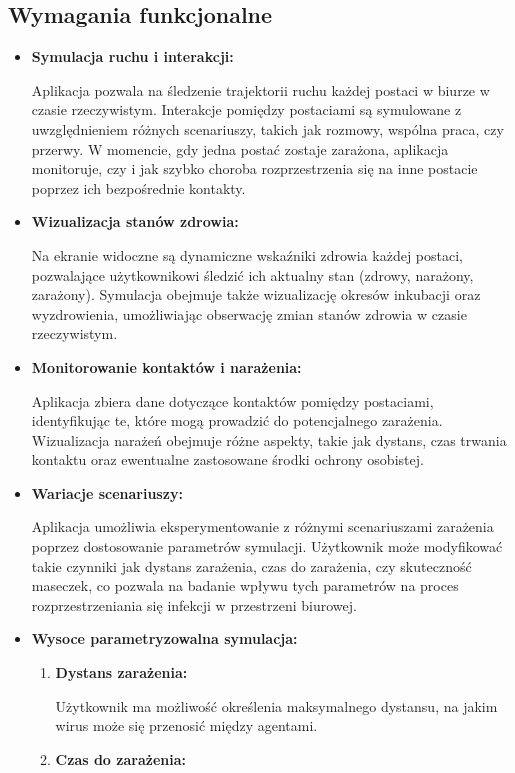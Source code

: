 \subsection{\textbf{Wymagania funkcjonalne}}
\begin{itemize}
	\item \textbf{ Symulacja ruchu i interakcji:}
	
	Aplikacja pozwala na śledzenie trajektorii ruchu każdej postaci w biurze w czasie rzeczywistym.
	Interakcje pomiędzy postaciami są symulowane z uwzględnieniem różnych scenariuszy, takich jak rozmowy, wspólna praca, czy przerwy.
	W momencie, gdy jedna postać zostaje zarażona, aplikacja monitoruje, czy i jak szybko choroba rozprzestrzenia się na inne postacie poprzez ich bezpośrednie kontakty.
	\item \textbf{Wizualizacja stanów zdrowia:}
	
	Na ekranie widoczne są dynamiczne wskaźniki zdrowia każdej postaci, pozwalające użytkownikowi śledzić ich aktualny stan (zdrowy, narażony, zarażony).
	Symulacja obejmuje także wizualizację okresów inkubacji oraz wyzdrowienia, umożliwiając obserwację zmian stanów zdrowia w czasie rzeczywistym.
	\item \textbf{Monitorowanie kontaktów i narażenia:}
	
	Aplikacja zbiera dane dotyczące kontaktów pomiędzy postaciami, identyfikując te, które mogą prowadzić do potencjalnego zarażenia.
	Wizualizacja narażeń obejmuje różne aspekty, takie jak dystans, czas trwania kontaktu oraz ewentualne zastosowane środki ochrony osobistej.
	\item \textbf{Wariacje scenariuszy:}
	
	Aplikacja umożliwia eksperymentowanie z różnymi scenariuszami zarażenia poprzez dostosowanie parametrów symulacji. Użytkownik może modyfikować takie czynniki jak dystans zarażenia, czas do zarażenia, czy skuteczność maseczek, co pozwala na badanie wpływu tych parametrów na proces rozprzestrzeniania się infekcji w przestrzeni biurowej.

	\item \textbf{Wysoce parametryzowalna symulacja:}
	\begin{enumerate}
		\item \textbf{Dystans zarażenia:}
		
		Użytkownik ma możliwość określenia maksymalnego dystansu, na jakim wirus może się przenosić między agentami.
		\item \textbf{Czas do zarażenia:}
		

\end{enumerate}
\end{itemize}
